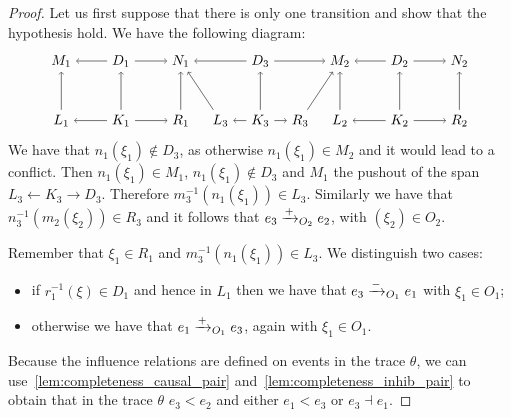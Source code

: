 \begin{proof}
  Let us first suppose that there is only one transition and show that the hypothesis hold. We have the following diagram:
  \[
  \begin{tikzpicture} %
    \node (l1) at (-1.5,0) {\(L_1\)};
    \node (k1) at (0,0) {\(K_1\)};
    \node (r1) at (1.5,0) {\(R_1\)};
    \node (m1) at (-1.5,1.5) {\(M_1\)};
    \node (d1) at (0,1.5) {\(D_1\)};
    \node (n1) at (1.5,1.5) {\(N_1\)};
    \draw [->] (k1) -- (l1);
    \draw [->] (k1) --  (r1);
    \draw [->] (d1) -- (m1);
    \draw [->] (d1) -- (n1);
    \draw [->] (l1) -- (m1);
    \draw [->] (k1) -- (d1);
    \draw [->] (r1) -- (n1);
    \node (l2) at (5.5,0) {\(L_2\)};
    \node (k2) at (7,0) {\(K_2\)};
    \node (r2) at (8.5,0) {\(R_2\)};
    \node (m2) at (5.5,1.5) {\(M_2\)};
    \node (d2) at (7,1.5) {\(D_2\)};
    \node (n2) at (8.5,1.5) {\(N_2\)};
    \draw [->] (k2) -- (l2);
    \draw [->] (k2) --  (r2);
    \draw [->] (d2) -- (m2);
    \draw [->] (d2) -- (n2);
    \draw [->] (l2) -- (m2);
    \draw [->] (k2) -- (d2);
    \draw [->] (r2) -- (n2);
    \node (l3) at (2.5,0) {\(L_3\)};
    \node (k3) at (3.5,0) {\(K_3\)};
    \node (r3) at (4.5,0) {\(R_3\)};
    \node (d3) at (3.5,1.5) {\(D_3\)};
    \draw [->] (k3) -- (l3);
    \draw [->] (k3) --  (r3);
    \draw [->] (d3) -- (n1);
    \draw [->] (d3) -- (m2);
    \draw [->] (l3) -- (n1);
    \draw [->] (k3) -- (d3);
    \draw [->] (r3) -- (m2);
  \end{tikzpicture}
  \]
We have that $n_1(\xi_1)\notin D_3$, as otherwise $n_1(\xi_1)\in M_2$ and it would lead to a conflict.
Then $n_1(\xi_1) \in M_1$, $n_1(\xi_1)\notin D_3$ and $M_1$ the pushout of the span $L_3\leftarrow K_3\rightarrow D_3$. Therefore $m_3^{-1}(n_1(\xi_1)) \in L_3$. Similarly we have that $n_3^{-1}(m_2(\xi_2))\in R_3$ and it follows that $e_3\mathrel{\xrightarrow{+}}_{O_2} e_2$, with $(\xi_2) \in O_2$.

Remember that $\xi_1\in R_1$ and $m_3^{-1}(n_1(\xi_1)) \in L_3$. We distinguish two cases:
\begin{itemize}
\item if $r_1^{-1}(\xi)\in D_1$ and hence in $L_1$ then we have that $e_3\mathrel{\xrightarrow{-}}_{O_1} e_1$ with $\xi_1\in O_1$;
\item otherwise we have that $e_1\mathrel{\xrightarrow{+}}_{O_1} e_3$, again with $\xi_1\in O_1$.
\end{itemize}

Because the influence relations are defined on events in the trace $\theta$, we can use~\autoref{lem:completeness_causal_pair} and~\autoref{lem:completeness_inhib_pair} to obtain that in the trace $\theta$ $e_3< e_2$ and either $e_1 < e_3$ or $e_3\dashv e_1$.


\end{proof}

